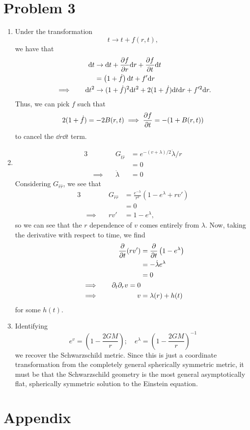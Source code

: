 \documentclass[12pt]{article}
\begin{document}
\section*{Problem 3}
\begin{enumerate}[label=(\alph*)]
    \item Under the transformation
    \[ t \to t + f(r, t), \]
    we have that 
    \begin{alignat*}{3}
        &\quad & \dd t &\to \dd t + \pdv{f}{r}\dd r + \pdv{f}{t}\dd t  \\
        &\quad &  &= \left(1 + \dot{f}\right)\dd t + f'\dd r \\
        &\implies\quad & \dd t^2 &\to (1 + \dot{f})^2\dd t^2 + 2(1 + \dot{f})\dd t\dd r + f'^2 \dd r.
    \end{alignat*}
    Thus, we can pick $f$ such that
    \[ 2(1 + \dot{f}) = -2B(r,t) \implies \pdv{f}{t} = -(1 + B(r,t)) \]
    to cancel the $\dd r\dd t$ term.

    \item 
    \begin{alignat*}{3}
        &\quad & G_{\hat{t}{\hat{r}}} &= e^{-(v+\lambda)/2}\dot{\lambda}/r \\
        &\quad &  &= 0 \\
        &\implies\quad & \dot{\lambda} &= 0
    \end{alignat*}
    Considering $G_{\hat{r}\hat{r}}$, we see that
    \begin{alignat*}{3}
        &\quad & G_{\hat{r}{\hat{r}}} &= \frac{e^{-\lambda}}{r^2}\left(1 - e^\lambda + rv'\right) \\
        &\quad &  &= 0 \\
        &\implies\quad & rv' &= 1 - e^\lambda,
    \end{alignat*}
    so we can see that the $r$ dependence of $v$ comes entirely from $\lambda$. Now, taking the derivative with respect to time, we find
    \begin{alignat*}{3}
        &\quad & \pdv{t}(rv') &= \pdv{t}\left(1 - e^\lambda\right) \\
        &\quad &  &= -\dot{\lambda}e^\lambda \\
        &\quad &  &= 0 \\
        &\implies\quad & \partial_t\partial_r v = 0 \\
        &\implies\quad & v &= \lambda(r) + h(t)
    \end{alignat*}
    for some $h(t)$.

    \item Identifying
    \[ e^v = \left(1 - \frac{2GM}{r}\right); \quad e^{\lambda} = \left(1 - \frac{2GM}{r}\right)^{-1} \]
    we recover the Schwarzschild metric. Since this is just a coordinate transformation from the completely general spherically symmetric metric, it must be that the Schwarzschild geometry is the most general asymptotically flat, spherically symmetric solution to the Einstein equation.
\end{enumerate}

\section*{Appendix}

\end{document}
